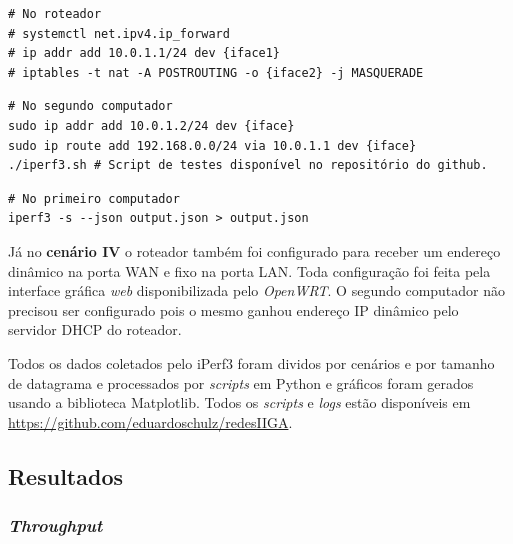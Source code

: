 \begin{verbatim}
# No roteador
# systemctl net.ipv4.ip_forward 
# ip addr add 10.0.1.1/24 dev {iface1} 
# iptables -t nat -A POSTROUTING -o {iface2} -j MASQUERADE 
\end{verbatim}

\begin{verbatim}
# No segundo computador
sudo ip addr add 10.0.1.2/24 dev {iface}
sudo ip route add 192.168.0.0/24 via 10.0.1.1 dev {iface}
./iperf3.sh # Script de testes disponível no repositório do github. 
\end{verbatim}

\begin{verbatim}
# No primeiro computador
iperf3 -s --json output.json > output.json
\end{verbatim}

Já no \textbf{cenário IV} o roteador também foi configurado para receber um endereço dinâmico na porta \ac{WAN} e fixo na porta \ac{LAN}. Toda configuração foi feita pela interface gráfica \textit{web} disponibilizada pelo \textit{OpenWRT}. O segundo computador não precisou ser configurado pois o mesmo ganhou endereço \ac{IP} dinâmico pelo servidor \ac{DHCP} do roteador.

Todos os dados coletados pelo iPerf3 foram dividos por cenários e por tamanho de datagrama e processados por \textit{scripts} em Python e gráficos foram gerados usando a biblioteca Matplotlib. Todos os \textit{scripts} e \textit{logs} estão disponíveis em \url{https://github.com/eduardoschulz/redesIIGA}.


\subsection{Resultados}
\subsubsection{\textit{Throughput}}

